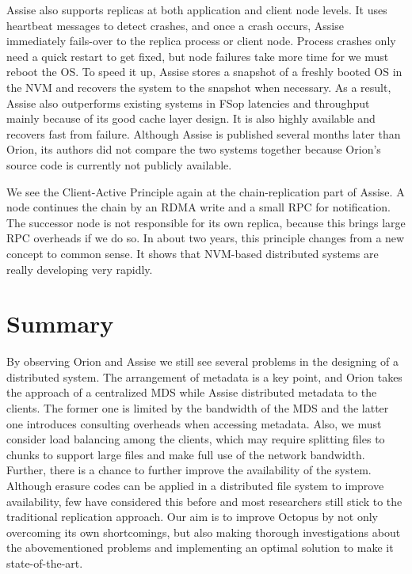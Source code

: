 \begin{survey}
Assise also supports replicas at both application and client node levels. It uses heartbeat messages to detect crashes, and once a crash occurs, Assise immediately fails-over to the replica process or client node. Process crashes only need a quick restart to get fixed, but node failures take more time for we must reboot the OS. To speed it up, Assise stores a snapshot of a freshly booted OS in the NVM and recovers the system to the snapshot when necessary. As a result, Assise also outperforms existing systems in FSop latencies and throughput mainly because of its good cache layer design. It is also highly available and recovers fast from failure. Although Assise is published several months later than Orion, its authors did not compare the two systems together because Orion’s source code is currently not publicly available.

We see the Client-Active Principle again at the chain-replication part of Assise. A node continues the chain by an RDMA write and a small RPC for notification. The successor node is not responsible for its own replica, because this brings large RPC overheads if we do so. In about two years, this principle changes from a new concept to common sense. It shows that NVM-based distributed systems are really developing very rapidly.

\section{Summary}
By observing Orion and Assise we still see several problems in the designing of a distributed system. The arrangement of metadata is a key point, and Orion takes the approach of a centralized MDS while Assise distributed metadata to the clients. The former one is limited by the bandwidth of the MDS and the latter one introduces consulting overheads when accessing metadata. Also, we must consider load balancing among the clients, which may require splitting files to chunks to support large files and make full use of the network bandwidth. Further, there is a chance to further improve the availability of the system. Although erasure codes can be applied in a distributed file system to improve availability, few have considered this before and most researchers still stick to the traditional replication approach. Our aim is to improve Octopus by not only overcoming its own shortcomings, but also making thorough investigations about the abovementioned problems and implementing an optimal solution to make it state-of-the-art.




\end{survey}
